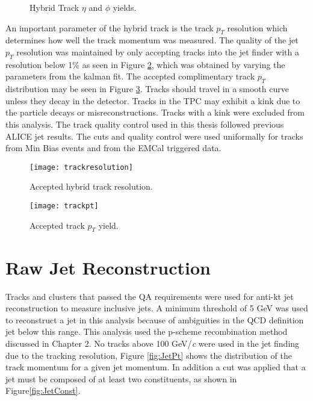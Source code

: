 \begin{figure}%
    \centering
    \qquad
    \caption{Hybrid Track $\eta$ and $\phi$ yields.}%
    \label{fig:Hybridtracketaphi}%
\end{figure}


An important parameter of the hybrid track is the track $p_{T}$ resolution which determines how well the track momentum was measured.  The quality of the jet $p_{T}$ resolution was maintained by only accepting tracks into the jet finder with a resolution below 1\% as seen in Figure \ref{fig:trackresolution}, which was obtained by varying the parameters from the kalman fit.  The accepted complimentary track $p_{T}$ distribution may be seen in Figure \ref{fig:hybtrackpt}.  Tracks should travel in a smooth curve unless they decay in the detector.  Tracks in the TPC may exhibit a kink due to the particle decays or misreconstructions.  Tracks with a kink were excluded from this analysis.  The track quality control used in this thesis followed previous ALICE jet results\cite{Acharya:2018eat}.  The cuts and quality control were used uniformally for tracks from Min Bias events and from the EMCal triggered data.

\begin{figure}[h]
\texttt{[image: trackresolution]}
\centering
\caption{Accepted hybrid track resolution.}
\label{fig:trackresolution}
\end{figure}

\begin{figure}[h]
\texttt{[image: trackpt]}
\centering
\caption{Accepted track $p_{T}$ yield.}
\label{fig:hybtrackpt}
\end{figure}


\section{Raw Jet Reconstruction}

Tracks and clusters that passed the QA requirements were used for anti-kt jet reconstruction to measure inclusive jets.  A minimum threshold of 5 GeV was used to reconstruct a jet in this analysis because of ambiguities in the QCD definition jet below this range.  This analysis used the p-scheme recombination method discussed in Chapter 2. No tracks above 100 GeV/\textit{c} were used in the jet finding due to the tracking resolution, Figure \ref{fig:JetPt} shows the distribution of the track momentum for a given jet momentum.  In addition a cut was applied that a jet must be composed of at least two constituents, as shown in Figure\ref{fig:JetConst}.

